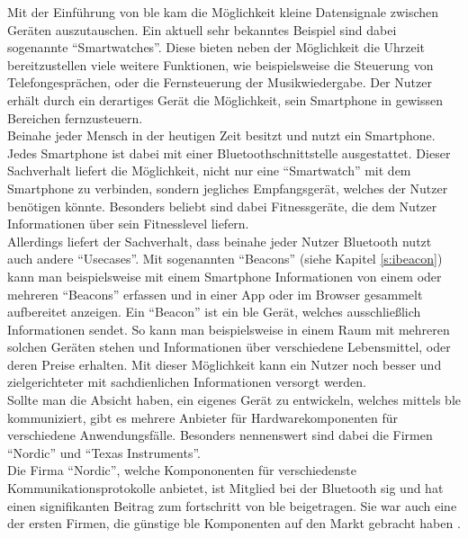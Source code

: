 \noindent Mit der Einführung von \ac{ble} kam die Möglichkeit kleine Datensignale zwischen Geräten auszutauschen. Ein aktuell sehr bekanntes Beispiel sind dabei sogenannte "`Smartwatches"'. Diese bieten neben der Möglichkeit die Uhrzeit bereitzustellen viele weitere Funktionen, wie beispielsweise die Steuerung von Telefongesprächen, oder die Fernsteuerung der Musikwiedergabe. Der Nutzer erhält durch ein derartiges Gerät die Möglichkeit, sein Smartphone in gewissen Bereichen fernzusteuern.\\

\noindent Beinahe jeder Mensch in der heutigen Zeit besitzt und nutzt ein Smartphone. Jedes Smartphone ist dabei mit einer Bluetoothschnittstelle ausgestattet. Dieser Sachverhalt liefert die Möglichkeit, nicht nur eine "`Smartwatch"' mit dem Smartphone zu verbinden, sondern jegliches Empfangsgerät, welches der Nutzer benötigen könnte. Besonders beliebt sind dabei Fitnessgeräte, die dem Nutzer Informationen über sein Fitnesslevel liefern.\\

\noindent Allerdings liefert der Sachverhalt, dass beinahe jeder Nutzer Bluetooth nutzt auch andere "`Usecases"'. Mit sogenannten "`Beacons"' (siehe Kapitel \ref{s:ibeacon}) kann man beispielsweise mit einem Smartphone Informationen von einem oder mehreren "`Beacons"' erfassen und in einer App oder im Browser gesammelt aufbereitet anzeigen. Ein "`Beacon"' ist ein \ac{ble} Gerät, welches ausschließlich Informationen sendet. So kann man beispielsweise in einem Raum mit mehreren solchen Geräten stehen und Informationen über verschiedene Lebensmittel, oder deren Preise erhalten. Mit dieser Möglichkeit kann ein Nutzer noch besser und zielgerichteter mit sachdienlichen Informationen versorgt werden.\\

\noindent Sollte man die Absicht haben, ein eigenes Gerät zu entwickeln, welches mittels \ac{ble} kommuniziert, gibt es mehrere Anbieter für Hardwarekomponenten für verschiedene Anwendungsfälle. Besonders nennenswert sind dabei die Firmen "`Nordic"' und "`Texas Instruments"'.\\

\noindent Die Firma "`Nordic"', welche Kompononenten für verschiedenste Kommunikationsprotokolle anbietet, ist Mitglied bei der Bluetooth \ac{sig} und hat einen signifikanten Beitrag zum fortschritt von \ac{ble} beigetragen. Sie war auch eine der ersten Firmen, die günstige \ac{ble} Komponenten auf den Markt gebracht haben \cite[Seite 75]{Townsend14:GSB}.\\

